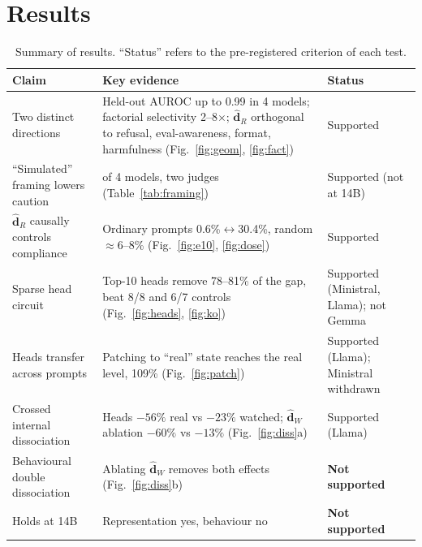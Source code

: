 \documentclass[10pt]{article}
\newcommand{\hR}{\hat{\bm{d}}_{R}}
\newcommand{\hW}{\hat{\bm{d}}_{W}}
\begin{document}
\section{Results}
\begin{table}[h]\centering\small
\caption{Summary of results. ``Status'' refers to the pre-registered criterion of each test.}
\label{tab:summary}
\begin{tabularx}{\linewidth}{>{\raggedright\arraybackslash}p{3.6cm}>{\raggedright\arraybackslash}X>{\raggedright\arraybackslash}p{2.2cm}}\toprule
Claim & Key evidence & Status\\\midrule
Two distinct directions & Held-out AUROC up to 0.99 in 4 models; factorial selectivity 2--8$\times$; $\hR$ orthogonal to refusal, eval-awareness, format, harmfulness (Fig.~\ref{fig:geom}, \ref{fig:fact}) & Supported\\
``Simulated'' framing lowers caution & 3 of 4 models, two judges (Table~\ref{tab:framing}) & Supported (not at 14B)\\
$\hR$ causally controls compliance & Ordinary prompts 0.6\%$\leftrightarrow$30.4\%, random ${\approx}$6--8\% (Fig.~\ref{fig:e10}, \ref{fig:dose}) & Supported\\
Sparse head circuit & Top-10 heads remove 78--81\% of the gap, beat 8/8 and 6/7 controls (Fig.~\ref{fig:heads}, \ref{fig:ko}) & Supported (Ministral, Llama); not Gemma\\
Heads transfer across prompts & Patching to ``real'' state reaches the real level, 109\% (Fig.~\ref{fig:patch}) & Supported (Llama); Ministral withdrawn\\
Crossed internal dissociation & Heads $-56\%$ real vs $-23\%$ watched; $\hW$ ablation $-60\%$ vs $-13\%$ (Fig.~\ref{fig:diss}a) & Supported (Llama)\\
Behavioural double dissociation & Ablating $\hW$ removes both effects (Fig.~\ref{fig:diss}b) & \textbf{Not supported}\\
Holds at 14B & Representation yes, behaviour no & \textbf{Not supported}\\\bottomrule
\end{tabularx}\end{table}
\end{document}
